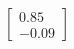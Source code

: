 \documentclass[preview]{standalone}
\begin{document}
\begin{align*}
\begin{bmatrix} 0.85 \\ -0.09 \end{bmatrix}
\end{align*}
\end{document}
